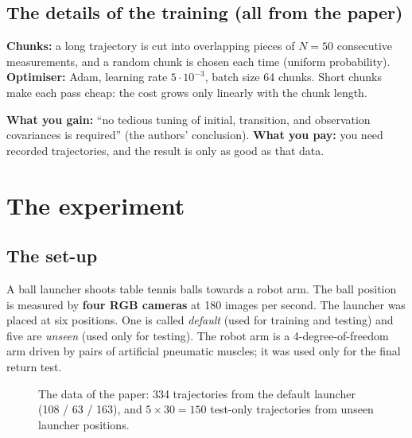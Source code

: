 \documentclass[11pt,a4paper]{article}
\begin{document}
\subsection{The details of the training (all from the paper)}
\textbf{Chunks:} a long trajectory is cut into overlapping pieces of $N=50$ consecutive
measurements, and a random chunk is chosen each time (uniform probability). \textbf{Optimiser:} Adam,
learning rate $5\cdot10^{-3}$, batch size 64 chunks. Short chunks make each pass cheap: the cost grows only
linearly with the chunk length.

\textbf{What you gain:} ``no tedious tuning of initial, transition, and observation covariances
is required'' (the authors' conclusion). \textbf{What you pay:} you need recorded trajectories, and the
result is only as good as that data.

\section{The experiment}

\subsection{The set-up}
A ball launcher shoots table tennis balls towards a robot arm. The ball position is measured by
\textbf{four RGB cameras} at 180 images per second. The launcher was placed at six positions.
One is called \emph{default} (used for training and testing) and five are \emph{unseen} (used only for testing).
The robot arm is a 4-degree-of-freedom arm driven by pairs of artificial pneumatic muscles; it was used only for
the final return test.

\begin{figure}[htbp]
\centering
{}
\caption{The data of the paper: 334 trajectories from the default launcher (108 / 63 / 163),
and $5\times30=150$ test-only trajectories from unseen launcher positions.}
\end{figure}
\end{document}

